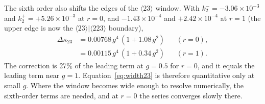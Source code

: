The sixth order also shifts the edges of the $\langle23\rangle$ window. With
$k_2^-=-3.06\times10^{-3}$ and $k_2^+=+5.26\times10^{-3}$ at $r=0$, and $-1.43\times10^{-4}$ and
$+2.42\times10^{-4}$ at $r=1$ (the upper edge is now the $\langle23\rangle|\langle223\rangle$ boundary),
\begin{align}
\Delta\kappa_{23}&=0.00768\,g^4\,(1+1.08\,g^2) &&(r=0),\nonumber\\
&=0.00115\,g^4\,(1+0.34\,g^2) &&(r=1).
\label{eq:width6}
\end{align}
The correction is 27\% of the leading term at $g=0.5$ for $r=0$, and it equals the leading term near $g=1$.
Equation~\eqref{eq:width23} is therefore quantitative only at small $g$. Where the window becomes wide enough
to resolve numerically, the sixth-order terms are needed, and at $r=0$ the series converges slowly there.


